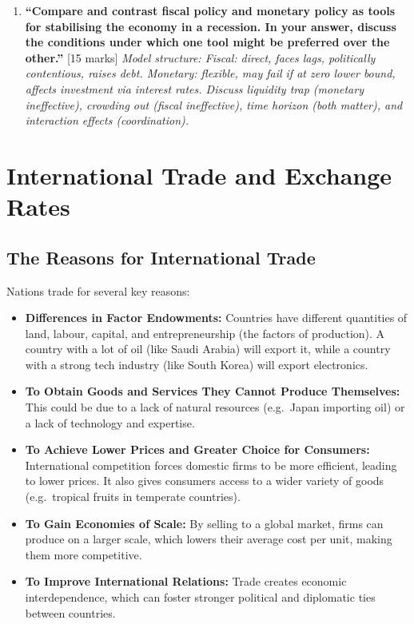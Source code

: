 \documentclass[11pt, a4paper, twoside]{book}
\begin{document}
\begin{exampractice}
\begin{enumerate}[leftmargin=*]
\item \textbf{``Compare and contrast fiscal policy and monetary policy as tools for stabilising the economy in a recession. In your answer, discuss the conditions under which one tool might be preferred over the other.''} [15 marks]
\textit{Model structure: Fiscal: direct, faces lags, politically contentious, raises debt. Monetary: flexible, may fail if at zero lower bound, affects investment via interest rates. Discuss liquidity trap (monetary ineffective), crowding out (fiscal ineffective), time horizon (both matter), and interaction effects (coordination).}
\end{enumerate}
\end{exampractice}

\chapter{International Trade and Exchange Rates}

\section{The Reasons for International Trade}

Nations trade for several key reasons:

\begin{itemize}
  \item \textbf{Differences in Factor Endowments:} Countries have different quantities of land, labour, capital, and entrepreneurship (the factors of production). A country with a lot of oil (like Saudi Arabia) will export it, while a country with a strong tech industry (like South Korea) will export electronics.
  \item \textbf{To Obtain Goods and Services They Cannot Produce Themselves:} This could be due to a lack of natural resources (e.g.\ Japan importing oil) or a lack of technology and expertise.
  \item \textbf{To Achieve Lower Prices and Greater Choice for Consumers:} International competition forces domestic firms to be more efficient, leading to lower prices. It also gives consumers access to a wider variety of goods (e.g.\ tropical fruits in temperate countries).
  \item \textbf{To Gain Economies of Scale:} By selling to a global market, firms can produce on a larger scale, which lowers their average cost per unit, making them more competitive.
  \item \textbf{To Improve International Relations:} Trade creates economic interdependence, which can foster stronger political and diplomatic ties between countries.
\end{itemize}
\end{document}

